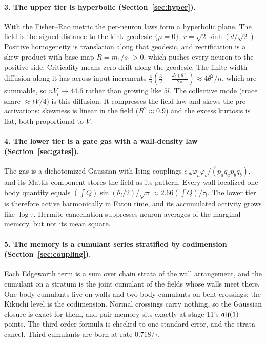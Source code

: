 \paragraph{3. The upper tier is hyperbolic (Section~\ref{sec:hyper}).} With the Fisher--Rao metric the per-neuron laws form a hyperbolic
plane. The field is the signed distance to the kink geodesic $\{\mu=0\}$, $r=\sqrt2\sinh(d/\sqrt2)$. Positive homogeneity is translation
along that geodesic, and rectification is a skew product with base map $R=m_1/s_1>0$, which pushes every neuron to the positive side.
Criticality means zero drift along the geodesic. The finite-width diffusion along it has across-input increments
$\frac4n(\frac32-\frac{J_2(\theta)}{2\pi})\approx4\theta^2/n$, which are summable, so $nV_l\to44.6$ rather than growing like $5l$. The
collective mode (trace share $\approx tV/4$) is this diffusion. It compresses the field law and skews the pre-activations: skewness is
linear in the field ($R^2\approx0.9$) and the excess kurtosis is flat, both proportional to $V$.

\paragraph{4. The lower tier is a gate gas with a wall-density law (Section~\ref{sec:gates}).} The gas is a dichotomized Gaussian with Ising
couplings $c_{ab}\varphi_a\varphi_b/(p_aq_ap_bq_b)$, and its Mattis component stores the field as its pattern. Every wall-localized
one-body quantity equals $(\int Q)\sin(\theta_l/2)/\sqrt\pi\approx2.66(\int Q)/\tau_l$. The lower tier is therefore active
harmonically in Fatou time, and its accumulated activity grows like $\log\tau$. Hermite cancellation suppresses neuron averages of
the marginal memory, but not its mean square.

\paragraph{5. The memory is a cumulant series stratified by codimension (Section~\ref{sec:coupling}).} Each Edgeworth term is a sum over
chain strata of the wall arrangement, and the cumulant on a stratum is the joint cumulant of the fields whose walls meet there.
One-body cumulants live on walls and two-body cumulants on bent crossings: the Kikuchi level is the codimension. Normal crossings carry
nothing, so the Gaussian closure is exact for them, and pair memory sits exactly at stage 11's $\mathfrak{aff}(1)$ points. The third-order
formula is checked to one standard error, and the strata cancel. Third cumulants are born at rate $0.718/\tau$.

